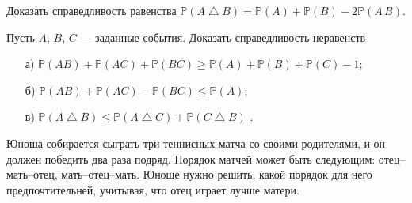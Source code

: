 \begin{problem}
Доказать справедливость равенства 
${\mathbb P}(A\bigtriangleup B)={\mathbb P}(A)+{\mathbb P}(B)-2{\mathbb P}(A\, B)$. 
\end{problem}


\begin{problem}
Пусть $A$, $B$, $C$ --- заданные события. Доказать справедливость неравенств 
\begin{enumerate}
\item[а)] ${\mathbb P}(AB)+{\mathbb P}(AC)+{\mathbb P}(BC)\geqslant {\mathbb P}(A)+{\mathbb P}(B)+{\mathbb P}(C)-1$; 
\item[б)] ${\mathbb P}(AB)+{\mathbb P}(AC)-{\mathbb P}(BC)\leqslant {\mathbb P}(A)$; 
\item[в)] ${\mathbb P}(A\bigtriangleup B)\leqslant {\mathbb P}(A\bigtriangleup C)+{\mathbb P}(C\bigtriangleup B)$ . 
\end{enumerate}
\end{problem}


\begin{problem}
Юноша собирается сыграть три теннисных матча со своими родителями, и он должен победить два раза подряд. 
Порядок матчей может быть следующим: отец--мать--отец, мать--отец--мать. Юноше нужно решить, какой порядок для него предпочтительней, 
учитывая, что отец играет лучше матери.

\end{problem}
